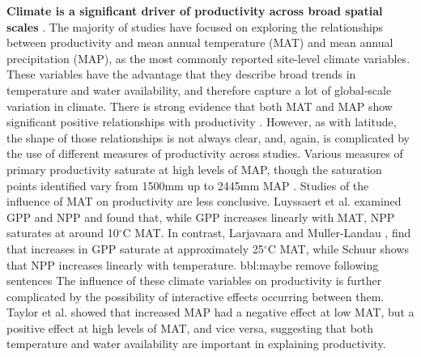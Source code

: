 \documentclass[]{article}
\begin{document}
\textbf{Climate is a significant driver of productivity across broad
spatial scales} \citep{cleveland_relationships_2011}. The majority of
studies have focused on exploring the relationships between productivity
and mean annual temperature (MAT) and mean annual precipitation (MAP),
as the most commonly reported site-level climate variables. These
variables have the advantage that they describe broad trends in
temperature and water availability, and therefore capture a lot of
global-scale variation in climate. There is strong evidence that both
MAT and MAP show significant positive relationships with productivity
\citep{chu_does_2016}. However, as with latitude, the shape of those
relationships is not always clear, and, again, is complicated by the use
of different measures of productivity across studies. Various measures
of primary productivity saturate at high levels of MAP, though the
saturation points identified vary from 1500mm \citep{luyssaert_co_2007}
up to 2445mm MAP \citep{schuur_productivity_2003}. Studies of the
influence of MAT on productivity are less conclusive. Luyssaert et al.
\citeyearpar{luyssaert_co_2007} examined GPP and NPP and found that,
while GPP increases linearly with MAT, NPP saturates at around
10\(^\circ\)C MAT. In contrast, Larjavaara and Muller-Landau
\citeyearpar{larjavaara_temperature_2012}, find that increases in GPP
saturate at approximately 25\(^\circ\)C MAT, while Schuur
\citeyearpar{schuur_productivity_2003} shows that NPP increases linearly
with temperature. bbl:maybe remove following sentences The influence of
these climate variables on productivity is further complicated by the
possibility of interactive effects occurring between them. Taylor et al.
\citeyearpar{taylor_temperature_2017} showed that increased MAP had a
negative effect at low MAT, but a positive effect at high levels of MAT,
and vice versa, suggesting that both temperature and water availability
are important in explaining productivity.
\end{document}
